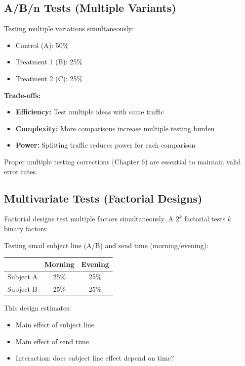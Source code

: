 \subsection{A/B/n Tests (Multiple Variants)}

Testing multiple variations simultaneously:
\begin{itemize}
    \item Control (A): 50\%
    \item Treatment 1 (B): 25\%
    \item Treatment 2 (C): 25\%
\end{itemize}

\textbf{Trade-offs:}
\begin{itemize}
    \item \textbf{Efficiency:} Test multiple ideas with same traffic
    \item \textbf{Complexity:} More comparisons increase multiple testing burden
    \item \textbf{Power:} Splitting traffic reduces power for each comparison
\end{itemize}

Proper multiple testing corrections (Chapter 6) are essential to maintain valid error rates.

\subsection{Multivariate Tests (Factorial Designs)}

Factorial designs test multiple factors simultaneously. A $2^k$ factorial tests $k$ binary factors:

\begin{example}
Testing email subject line (A/B) and send time (morning/evening):
\begin{center}
\begin{tabular}{lcc}
\toprule
& \textbf{Morning} & \textbf{Evening} \\
\midrule
Subject A & 25\% & 25\% \\
Subject B & 25\% & 25\% \\
\bottomrule
\end{tabular}
\end{center}

This design estimates:
\begin{itemize}
    \item Main effect of subject line
    \item Main effect of send time
    \item Interaction: does subject line effect depend on time?
\end{itemize}
\end{example}

